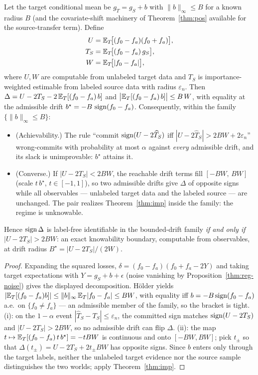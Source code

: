 \begin{proposition}\label{thm:reg-iff}
Let the target conditional mean be $g_T=g_S+b$ with $\|b\|_\infty\le B$ for a known
radius $B$ (and the covariate-shift machinery of Theorem~\ref{thm:pos} available for the
source-transfer term). Define
\[
\begin{aligned}
U &=\mathbb{E}_T\!\big[(f_0-f_a)(f_0+f_a)\big],\\
T_S &=\mathbb{E}_T\!\big[(f_0-f_a)\,g_S\big],\\
W &=\mathbb{E}_T\!\big[|f_0-f_a|\big],
\end{aligned}
\]
where $U,W$ are computable from unlabeled target data and $T_S$ is importance-weighted
estimable from labeled source data with radius $\varepsilon_n$. Then
$\Delta=U-2T_S-2\,\mathbb{E}_T[(f_0-f_a)\,b]$ and $\big|\mathbb{E}_T[(f_0-f_a)\,b]\big|\le B\,W$, with
equality at the admissible drift $b^\star=-B\,\operatorname{sign}(f_0-f_a)$. Consequently, within the
family $\{\|b\|_\infty\le B\}$:
\begin{itemize}
\item[\textup{(i)}] \textup{(Achievability.)} The rule ``commit $\operatorname{sign}(U-2\widehat T_S)$
iff $|U-2\widehat T_S|>2BW+2\varepsilon_n$'' wrong-commits with probability at most
$\alpha$ against \emph{every} admissible drift, and its slack is unimprovable:
$b^\star$ attains it.
\item[\textup{(ii)}] \textup{(Converse.)} If $|U-2T_S|<2BW$, the reachable drift terms
fill $[-BW,\,BW]$ (scale $t\,b^\star$, $t\in[-1,1]$), so two admissible drifts give
$\Delta$ of opposite signs while all observables --- unlabeled target data and the
labeled source --- are unchanged. The pair realizes Theorem~\ref{thm:imp} inside the
family: the regime is unknowable.
\end{itemize}
Hence $\operatorname{sign}\Delta$ is label-free identifiable in the bounded-drift family \emph{if and
only if} $|U-2T_S|>2BW$: an exact knowability boundary, computable from observables, at
drift radius $B^\star=|U-2T_S|/(2W)$.
\end{proposition}
\begin{proof}
Expanding the squared losses, $\delta=(f_0-f_a)(f_0+f_a-2Y)$ and taking target
expectations with $Y=g_S+b+\epsilon$ (noise vanishing by
Proposition~\ref{thm:reg-noise}) gives the displayed decomposition. H\"older yields
$|\mathbb{E}_T[(f_0-f_a)b]|\le \|b\|_\infty\,\mathbb{E}_T|f_0-f_a|\le BW$, with equality iff
$b=-B\operatorname{sign}(f_0-f_a)$ a.e.\ on $\{f_0\ne f_a\}$ --- an admissible member of the family,
so the bracket is tight. (i): on the $1-\alpha$ event
$|\widehat T_S-T_S|\le\varepsilon_n$, the committed sign matches
$\operatorname{sign}(U-2T_S)$ and $|U-2T_S|>2BW$, so no admissible drift can flip $\Delta$.
(ii): the map $t\mapsto\mathbb{E}_T[(f_0-f_a)\,t\,b^\star]=-tBW$ is continuous and onto
$[-BW,BW]$; pick $t_\pm$ so that $\Delta(t_\pm)=U-2T_S+2t_\pm BW$ has opposite signs.
Since $b$ enters only through the target labels, neither the unlabeled target evidence
nor the source sample distinguishes the two worlds; apply Theorem~\ref{thm:imp}.
\end{proof}

